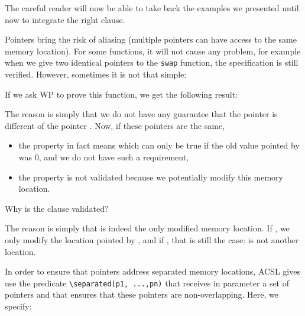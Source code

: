 


The careful reader will now be able to take back the examples we
presented until now to integrate the right  clause.





Pointers bring the risk of aliasing (multiple pointers can have access
to the same memory location). For some functions, it will not cause any
problem, for example when we give two identical pointers to the
\texttt{swap} function, the specification is still verified. However,
sometimes it is not that simple:






If we ask WP to prove this function, we get the following result:





The reason is simply that we do not have any guarantee that the pointer
 is different of the pointer . Now, if these
pointers are the same,



\begin{itemize}
\item   the property  in fact
  means  which can only
  be true if the old value pointed by  was $0$, and we do
  not have such a requirement,
\item
  the property  is not validated
  because we potentially modify this memory location.
\end{itemize}


\begin{Question}
  Why is the  clause validated?

  The reason is simply that  is indeed the only modified memory
  location. If , we only modify the location pointed by
  , and if , \textbar{} that is still the case:
   is not another location.
\end{Question}


In order to ensure that pointers address separated memory locations,
ACSL gives use the predicate
\texttt{\textbackslash{}separated(p1,\ ...,pn)} that receives in
parameter a set of pointers and that ensures that these pointers are
non-overlapping. Here, we specify:



